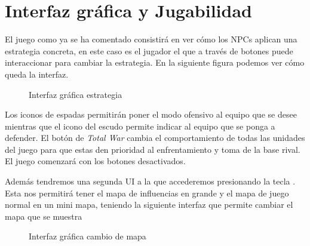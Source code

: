 \section{Interfaz gráfica y Jugabilidad}

El juego como ya se ha comentado consistirá en ver cómo los NPCs aplican una estrategia concreta, en este caso es el jugador el que a través de botones puede interaccionar para cambiar la estrategia. En la siguiente figura podemos ver cómo queda la interfaz.

\begin{figure}[H]
    \centering
    
    \caption{Interfaz gráfica estrategia}
    \label{fig:mainButtons}
\end{figure}

Los iconos de espadas permitirán poner el modo ofensivo al equipo que se desee mientras que el icono del escudo permite indicar al equipo que se ponga a defender. El botón de \textit{Total War} cambia el comportamiento de todas las unidades del juego para que estas den prioridad al enfrentamiento y toma de la base rival. El juego comenzará con los botones desactivados.

Además tendremos una segunda UI a la que accederemos presionando la tecla . Esta nos permitirá tener el mapa de influencias en grande y el mapa de juego normal en un mini mapa, teniendo la siguiente interfaz que permite cambiar el mapa que se muestra \begin{figure}[H]
    \centering

    \caption{Interfaz gráfica cambio de mapa}
    \label{fig:mainButtons}
\end{figure}

